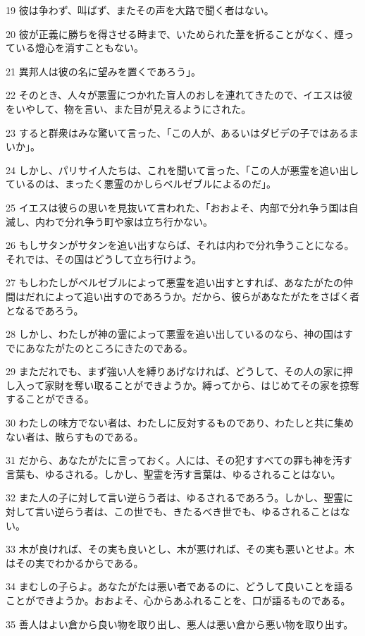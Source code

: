 \par 19 彼は争わず、叫ばず、またその声を大路で聞く者はない。
\par 20 彼が正義に勝ちを得させる時まで、いためられた葦を折ることがなく、煙っている燈心を消すこともない。
\par 21 異邦人は彼の名に望みを置くであろう」。
\par 22 そのとき、人々が悪霊につかれた盲人のおしを連れてきたので、イエスは彼をいやして、物を言い、また目が見えるようにされた。
\par 23 すると群衆はみな驚いて言った、「この人が、あるいはダビデの子ではあるまいか」。
\par 24 しかし、パリサイ人たちは、これを聞いて言った、「この人が悪霊を追い出しているのは、まったく悪霊のかしらベルゼブルによるのだ」。
\par 25 イエスは彼らの思いを見抜いて言われた、「おおよそ、内部で分れ争う国は自滅し、内わで分れ争う町や家は立ち行かない。
\par 26 もしサタンがサタンを追い出すならば、それは内わで分れ争うことになる。それでは、その国はどうして立ち行けよう。
\par 27 もしわたしがベルゼブルによって悪霊を追い出すとすれば、あなたがたの仲間はだれによって追い出すのであろうか。だから、彼らがあなたがたをさばく者となるであろう。
\par 28 しかし、わたしが神の霊によって悪霊を追い出しているのなら、神の国はすでにあなたがたのところにきたのである。
\par 29 まただれでも、まず強い人を縛りあげなければ、どうして、その人の家に押し入って家財を奪い取ることができようか。縛ってから、はじめてその家を掠奪することができる。
\par 30 わたしの味方でない者は、わたしに反対するものであり、わたしと共に集めない者は、散らすものである。
\par 31 だから、あなたがたに言っておく。人には、その犯すすべての罪も神を汚す言葉も、ゆるされる。しかし、聖霊を汚す言葉は、ゆるされることはない。
\par 32 また人の子に対して言い逆らう者は、ゆるされるであろう。しかし、聖霊に対して言い逆らう者は、この世でも、きたるべき世でも、ゆるされることはない。
\par 33 木が良ければ、その実も良いとし、木が悪ければ、その実も悪いとせよ。木はその実でわかるからである。
\par 34 まむしの子らよ。あなたがたは悪い者であるのに、どうして良いことを語ることができようか。おおよそ、心からあふれることを、口が語るものである。
\par 35 善人はよい倉から良い物を取り出し、悪人は悪い倉から悪い物を取り出す。
